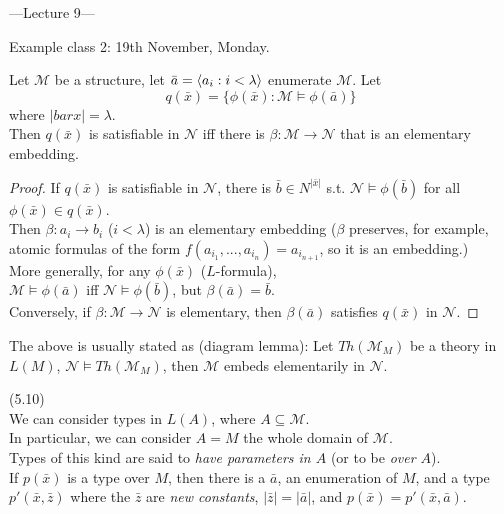 \documentclass[a4paper]{article}
\begin{document}
---Lecture 9---

Example class 2: 19th November, Monday.

\begin{lemma}
    Let $\mathcal{M}$ be a structure, let $\bar{a} = \langle a_i:i<\lambda \rangle$ enumerate $\mathcal{M}$. Let
    $$q(\bar{x}) = \{\phi(\bar{x}): \mathcal{M} \vDash \phi(\bar{a})\}$$
    where $|bar{x}| = \lambda$.\\
    Then $q(\bar{x})$ is satisfiable in $\mathcal{N}$ iff there is $\beta:\mathcal{M} \to \mathcal{N}$ that is an elementary embedding.
    \begin{proof}
        If $q(\bar{x})$ is satisfiable in $\mathcal{N}$, there is $\bar{b} \in N^{|\bar{x}|}$ s.t. $\mathcal{N} \vDash \phi(\bar{b})$ for all $\phi(\bar{x}) \in q(\bar{x})$.\\
        Then $\beta:a_i \to b_i$ ($i < \lambda$) is an elementary embedding ($\beta$ preserves, for example, atomic formulas of the form $f(a_{i_1},...,a_{i_n}) = a_{i_{n+1}}$, so it is an embedding.)\\
        More generally, for any $\phi(\bar{x})$ ($L$-formula),\\
        $\mathcal{M} \vDash \phi(\bar{a})$ iff $\mathcal{N} \vDash \phi(\bar{b})$, but $\beta(\bar{a}) = \bar{b}$.\\
        Conversely, if $\beta:\mathcal{M} \to \mathcal{N}$ is elementary, then $\beta(\bar{a})$ satisfies $q(\bar{x})$ in $\mathcal{N}$.
    \end{proof}
\end{lemma}

\begin{rem}
    The above is usually stated as (diagram lemma): Let $Th(\mathcal{M}_M)$ be a theory in $L(M)$, $\mathcal{N} \vDash Th(\mathcal{M}_M)$, then $\mathcal{M}$ embeds elementarily in $\mathcal{N}$.
\end{rem}

\begin{rem} (5.10)\\
    We can consider types in $L(A)$, where $A \subseteq \mathcal{M}$.\\
    In particular, we can consider $A=M$ the whole domain of $\mathcal{M}$.\\
    Types of this kind are said to \emph{have parameters in $A$} (or to be \emph{over $A$}).\\
    If $p(\bar{x})$ is a type over $M$, then there is a $\bar{a}$, an enumeration of $M$, and a type $p'(\bar{x},\bar{z})$ where the $\bar{z}$ are \emph{new constants}, $|\bar{z}| = |\bar{a}|$, and $p(\bar{x}) = p'(\bar{x},\bar{a})$.
\end{rem}
\end{document}
